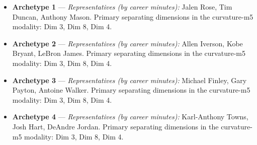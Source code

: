 \begin{itemize}
\item \textbf{Archetype 1} --- \emph{Representatives (by career minutes):} Jalen Rose, Tim Duncan, Anthony Mason. Primary separating dimensions in the curvature-m5 modality: Dim 3, Dim 8, Dim 4.
\item \textbf{Archetype 2} --- \emph{Representatives (by career minutes):} Allen Iverson, Kobe Bryant, LeBron James. Primary separating dimensions in the curvature-m5 modality: Dim 3, Dim 8, Dim 4.
\item \textbf{Archetype 3} --- \emph{Representatives (by career minutes):} Michael Finley, Gary Payton, Antoine Walker. Primary separating dimensions in the curvature-m5 modality: Dim 3, Dim 8, Dim 4.
\item \textbf{Archetype 4} --- \emph{Representatives (by career minutes):} Karl-Anthony Towns, Josh Hart, DeAndre Jordan. Primary separating dimensions in the curvature-m5 modality: Dim 3, Dim 8, Dim 4.
\end{itemize}
